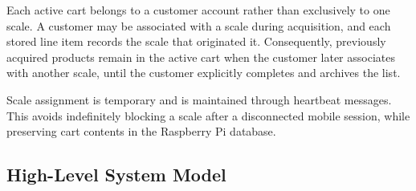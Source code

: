 \documentclass[11pt,a4paper]{article}
\begin{document}
Each active cart belongs to a customer account rather than exclusively to one scale. A customer may be associated with a scale during acquisition, and each stored line item records the scale that originated it. Consequently, previously acquired products remain in the active cart when the customer later associates with another scale, until the customer explicitly completes and archives the list.

Scale assignment is temporary and is maintained through heartbeat messages. This avoids indefinitely blocking a scale after a disconnected mobile session, while preserving cart contents in the Raspberry Pi database.

\subsection{High-Level System Model}
\end{document}
